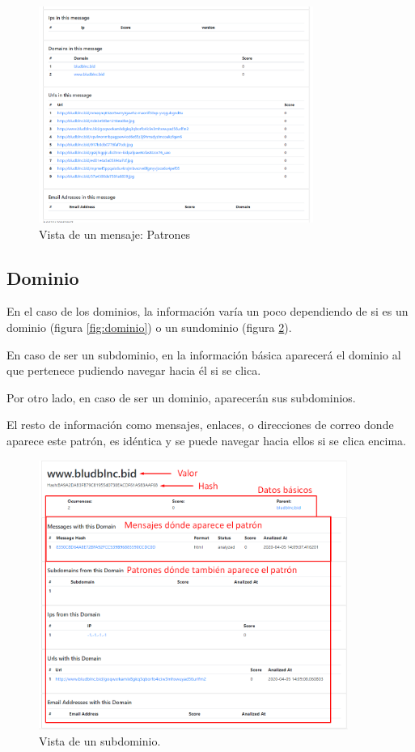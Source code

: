 \begin{figure}[htb]
    \centering
    \includegraphics[width=0.8\textwidth]{imagenes/capturasAplicacion/Mensaje_patrones.png}
\caption{Vista de un mensaje: Patrones}
\label{fig:mensaje_patrones}
\end{figure}

\clearpage
\subsection{Dominio}
En el caso de los dominios, la información varía un poco dependiendo de si es un dominio (figura \ref{fig:dominio}) o un sundominio (figura \ref{fig:Subdominio}).

En caso de ser un subdominio, en la información básica aparecerá el dominio al que pertenece pudiendo navegar hacia él si se clica. 

Por otro lado, en caso de ser un dominio, aparecerán sus subdominios.

El resto de información como mensajes, enlaces, o direcciones de correo donde aparece este patrón, es idéntica y se puede navegar hacia ellos si se clica encima. 

\begin{figure}[htb]
    \centering
    \includegraphics[width=0.9\textwidth]{imagenes/capturasAplicacion/Subdominio.png}
\caption{Vista de un subdominio.}
\label{fig:Subdominio}
\end{figure}


